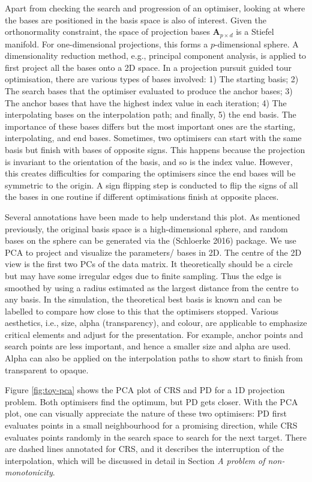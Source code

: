 Apart from checking the search and progression of an optimiser, looking at where the bases are positioned in the basis space is also of interest. Given the orthonormality constraint, the space of projection bases \(\mathbf{A}_{p \times d}\) is a Stiefel manifold. For one-dimensional projections, this forms a \(p\)-dimensional sphere. A dimensionality reduction method, e.g., principal component analysis, is applied to first project all the bases onto a 2D space. In a projection pursuit guided tour optimisation, there are various types of bases involved: 1) The starting basis; 2) The search bases that the optimiser evaluated to produce the anchor bases; 3) The anchor bases that have the highest index value in each iteration; 4) The interpolating bases on the interpolation path; and finally, 5) the end basis. The importance of these bases differs but the most important ones are the starting, interpolating, and end bases. Sometimes, two optimisers can start with the same basis but finish with bases of opposite signs. This happens because the projection is invariant to the orientation of the basis, and so is the index value. However, this creates difficulties for comparing the optimisers since the end bases will be symmetric to the origin. A sign flipping step is conducted to flip the signs of all the bases in one routine if different optimisations finish at opposite places.

Several annotations have been made to help understand this plot. As mentioned previously, the original basis space is a high-dimensional sphere, and random bases on the sphere can be generated via the  (Schloerke 2016) package. We use PCA to project and visualize the parameters/ bases in 2D. The centre of the 2D view is the first two PCs of the data matrix. It theoretically should be a circle but may have some irregular edges due to finite sampling. Thus the edge is smoothed by using a radius estimated as the largest distance from the centre to any basis. In the simulation, the theoretical best basis is known and can be labelled to compare how close to this that the optimisers stopped. Various aesthetics, i.e., size, alpha (transparency), and colour, are applicable to emphasize critical elements and adjust for the presentation. For example, anchor points and search points are less important, and hence a smaller size and alpha are used. Alpha can also be applied on the interpolation paths to show start to finish from transparent to opaque.

Figure \ref{fig:toy-pca} shows the PCA plot of CRS and PD for a 1D projection problem. Both optimisers find the optimum, but PD gets closer. With the PCA plot, one can visually appreciate the nature of these two optimisers: PD first evaluates points in a small neighbourhood for a promising direction, while CRS evaluates points randomly in the search space to search for the next target. There are dashed lines annotated for CRS, and it describes the interruption of the interpolation, which will be discussed in detail in Section \emph{A problem of non-monotonicity}.

